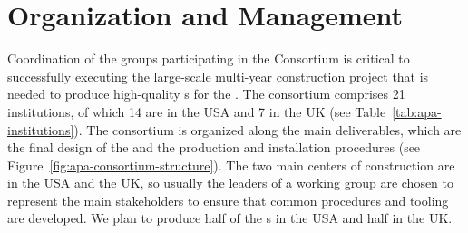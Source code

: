 \section{Organization and Management}
\label{sec:fdsp-apa-org}

Coordination of the groups participating in the   Consortium is critical to successfully executing the large-scale multi-year construction project that is needed to produce high-quality s for the  .   The  consortium comprises \num{21} institutions, of which \num{14} are in the USA and \num{7} in the UK (see Table~\ref{tab:apa-institutions}). The consortium is organized along the main deliverables, which are the final design of the  and the  production and installation procedures (see Figure~\ref{fig:apa-consortium-structure}).  The two main centers of  construction are in the USA and the UK, so usually the leaders of a working group are chosen to represent the main stakeholders to ensure that common procedures and tooling are developed.  We plan to produce half of the  s in the USA and half in the UK.

